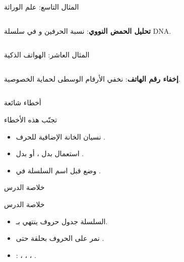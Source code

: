 \documentclass[aspectratio=169, 11pt, t, xcolor={table}]{beamer}
\begin{document}
\begin{frame}[t]{المثال التاسع: علم الوراثة}
    \begin{columns}[T]
        {\small \textbf{تحليل الحمض النووي}: نسبة الحرفين  و في سلسلة \textenglish{DNA}.\par}
        \vspace{0.3cm}
    \end{columns}
\end{frame}

\begin{frame}[t]{المثال العاشر: الهواتف الذكية}
    \begin{columns}[T]
        {\small \textbf{إخفاء رقم الهاتف}: نخفي الأرقام الوسطى لحماية الخصوصية.\par}
        \vspace{0.3cm}
    \end{columns}
\end{frame}

\begin{frame}{أخطاء شائعة}
    \begin{obox}{\faExclamationTriangle\quad تجنّب هذه الأخطاء}
        \begin{itemize}
            \item نسيان الخانة الإضافية للحرف .
            \item استعمال \code{=} بدل ، أو \code{==} بدل .
            \item وضع \code{\&} قبل اسم السلسلة في .
        \end{itemize}
    \end{obox}
\end{frame}

\begin{frame}{خلاصة الدرس}
    \begin{tbox}{\faCheckCircle\quad خلاصة الدرس}
        \begin{itemize}
            \item السلسلة جدول حروف ينتهي بـ.
            \item نمر على الحروف بحلقة حتى .
            \item {}: ، ، ، .
        \end{itemize}
    \end{tbox}
\end{frame}
\end{document}
